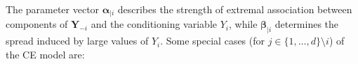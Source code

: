 \documentclass[12pt]{article}
\begin{document}
The parameter vector $\symbf{\alpha}_{\mid i}$ describes the strength of extremal association between components of $\symbf{Y}_{-i}$ and the conditioning variable $Y_i$, while $\symbf{\beta}_{\mid i}$ determines the spread induced by large values of $Y_i$. 
Some special cases (for $j\in\{1,\ldots,d\}\setminus i$) of the CE model are:
\end{document}

